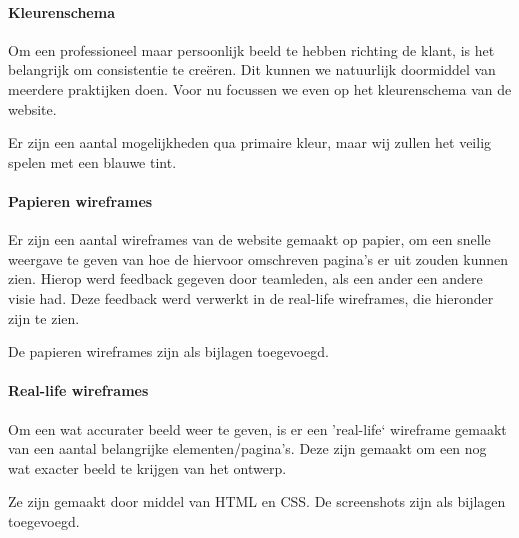 \paragraph{Kleurenschema}

Om een professioneel maar persoonlijk beeld te hebben richting de klant,
is het belangrijk om consistentie te cre\"eren.
Dit kunnen we natuurlijk doormiddel van meerdere praktijken doen.
Voor nu focussen we even op het kleurenschema van de website.

Er zijn een aantal mogelijkheden qua primaire kleur,
maar wij zullen het veilig spelen met een blauwe tint.



\paragraph{Papieren wireframes}

Er zijn een aantal wireframes van de website gemaakt op papier,
om een snelle weergave te geven van hoe de hiervoor omschreven pagina's
er uit zouden kunnen zien.
Hierop werd feedback gegeven door teamleden,
als een ander een andere visie had.
Deze feedback werd verwerkt in de real-life wireframes, die hieronder zijn te zien.

De papieren wireframes zijn als bijlagen toegevoegd.

\paragraph{Real-life wireframes}

Om een wat accurater beeld weer te geven,
is er een 'real-life` wireframe gemaakt van een aantal belangrijke elementen/pagina's.
Deze zijn gemaakt om een nog wat exacter beeld te krijgen van het ontwerp.

Ze zijn gemaakt door middel van HTML en CSS.
De screenshots zijn als bijlagen toegevoegd.




